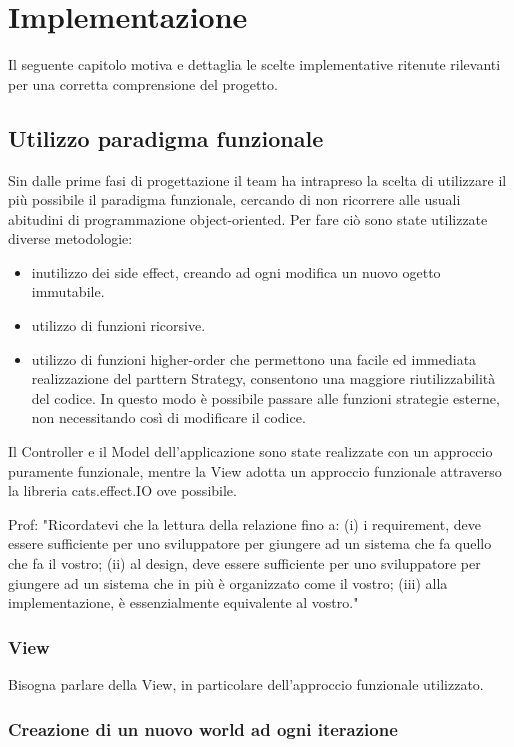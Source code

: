 \section{Implementazione}
Il seguente capitolo motiva e dettaglia le scelte implementative ritenute rilevanti per una corretta comprensione del progetto.


\subsection{Utilizzo paradigma funzionale}
Sin dalle prime fasi di progettazione il team ha intrapreso la scelta di utilizzare il più possibile il paradigma funzionale, cercando di non ricorrere alle usuali abitudini di programmazione object-oriented. Per fare ciò sono state utilizzate diverse metodologie: 
\begin{itemize}
    \item inutilizzo dei side effect, creando ad ogni modifica un nuovo ogetto immutabile.
    \item utilizzo di funzioni ricorsive.
    \item utilizzo di funzioni higher-order che permettono una facile ed immediata realizzazione del parttern Strategy, consentono una maggiore riutilizzabilità del codice. In questo modo è possibile passare alle funzioni strategie esterne, non necessitando così di modificare il codice.
\end{itemize}

Il Controller e il Model dell'applicazione sono state realizzate con un approccio puramente funzionale, mentre la View adotta un approccio funzionale attraverso la libreria cats.effect.IO ove possibile.


Prof: "Ricordatevi che la lettura della relazione fino a: (i) i requirement, deve essere sufficiente per uno sviluppatore per giungere ad un sistema che fa quello che fa il vostro; (ii) al design, deve essere sufficiente per uno sviluppatore per giungere ad un sistema che in più è organizzato come il vostro; (iii) alla implementazione, è essenzialmente equivalente al vostro."
\subsubsection{View}
Bisogna parlare della View, in particolare dell'approccio funzionale utilizzato.

\subsubsection{Creazione di un nuovo world ad ogni iterazione}


